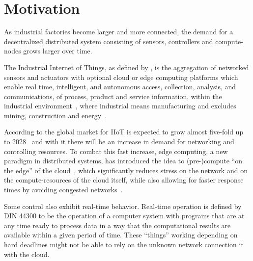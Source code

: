 \section{Motivation}


As industrial factories become larger and more connected, the demand for a
decentralized distributed system consisting of sensors, controllers and
compute-nodes grows larger over time.

The Industrial Internet of Things, as defined by
\citeauthor{boyes_industrial_2018}, is the aggregation of networked sensors and
actuators with optional cloud or edge computing platforms which enable real
time, intelligent, and autonomous access, collection, analysis, and
communications, of process, product and service information, within the
industrial environment~\cite{boyes_industrial_2018}, where industrial means
manufacturing and excludes mining, construction and
energy~\cite{noauthor_industry_nodate}.

According to \citeauthor{placek_industrial_nodate} the global market for IIoT is
expected to grow almost five-fold up to 2028~\cite{placek_industrial_nodate}
and with it there will be an increase in demand for networking and controlling
resources. To combat this fast increase, edge computing, a new paradigm in
distributed systems, has introduced the idea to (pre-)compute \enquote{on the
edge} of the cloud~\cite{shi_edge_2016}, which significantly reduces stress on
the network and on the compute-resources of the cloud itself, while also
allowing for faster response times by avoiding congested
networks~\cite{shi_edge_2016}.

Some control also exhibit real-time behavior. Real-time operation is defined by
DIN 44300 to be the operation of a computer system with programs that are at any
time ready to process data in a way that the computational results are available
within a given period of time. These \enquote{things} working depending on hard
deadlines might not be able to rely on the unknown network connection it with
the cloud.
 


